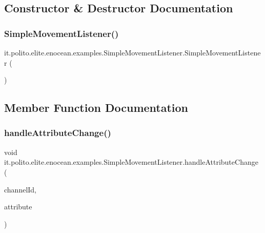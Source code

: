 \subsection{Constructor \& Destructor Documentation}
\hypertarget{classit_1_1polito_1_1elite_1_1enocean_1_1examples_1_1_simple_movement_listener_af599c6914ed856fea47351a23545e000}{}\label{classit_1_1polito_1_1elite_1_1enocean_1_1examples_1_1_simple_movement_listener_af599c6914ed856fea47351a23545e000} 
\subsubsection{\texorpdfstring{Simple\+Movement\+Listener()}{SimpleMovementListener()}}
{\footnotesize\ttfamily it.\+polito.\+elite.\+enocean.\+examples.\+Simple\+Movement\+Listener.\+Simple\+Movement\+Listener (\begin{DoxyParamCaption}{ }\end{DoxyParamCaption})}



\subsection{Member Function Documentation}
\hypertarget{classit_1_1polito_1_1elite_1_1enocean_1_1examples_1_1_simple_movement_listener_a58979c6da36565e3ce5586b02731abc2}{}\label{classit_1_1polito_1_1elite_1_1enocean_1_1examples_1_1_simple_movement_listener_a58979c6da36565e3ce5586b02731abc2} 
\subsubsection{\texorpdfstring{handle\+Attribute\+Change()}{handleAttributeChange()}}
{\footnotesize\ttfamily void it.\+polito.\+elite.\+enocean.\+examples.\+Simple\+Movement\+Listener.\+handle\+Attribute\+Change (\begin{DoxyParamCaption}\item[{int}]{channel\+Id,  }\item[{\hyperlink{classit_1_1polito_1_1elite_1_1enocean_1_1enj_1_1eep_1_1_e_e_p_attribute}{E\+E\+P\+Attribute}$<$?$>$}]{attribute }\end{DoxyParamCaption})}

